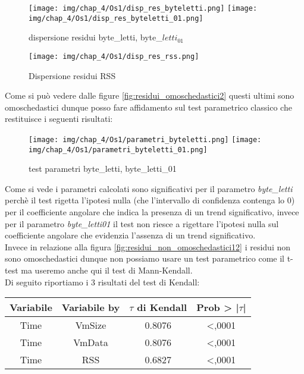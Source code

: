\begin{figure}[H]
    \centering
    \texttt{[image: img/chap\_4/Os1/disp\_res\_byteletti.png]}
    \texttt{[image: img/chap\_4/Os1/disp\_res\_byteletti\_01.png]}
    \caption{dispersione residui byte\_letti, byte\_$letti_{01}$}
    \label{fig:residui_omoschedastici}
\end{figure}
\begin{figure}[H]
    \centering
    \texttt{[image: img/chap\_4/Os1/disp\_res\_rss.png]}
    \caption{Dispersione residui RSS}
    \label{fig:residui_non_omoschedastici2}
\end{figure}
\noindent
Come si può vedere dalle figure \ref{fig:residui_omoschedastici2} questi ultimi sono omoschedastici dunque posso fare affidamento sul test parametrico classico che restituisce i seguenti risultati:
\begin{figure}[H]
    \centering
    \texttt{[image: img/chap\_4/Os1/parametri\_byteletti.png]}
    \texttt{[image: img/chap\_4/Os1/parametri\_byteletti\_01.png]}
    \caption{test parametri byte\_letti, byte\_letti\_01}
    \label{fig:residui_omoschedastici12}
\end{figure}
\noindent
Come si vede i parametri calcolati sono significativi per il parametro \textit{byte\_letti} perchè il test rigetta l'ipotesi nulla (che l'intervallo di confidenza contenga lo 0) per il coefficiente angolare che indica la presenza di un trend significativo, invece per il parametro \textit{byte\_letti01} il test non riesce a rigettare l'ipotesi nulla sul coefficiente angolare che evidenzia l'assenza di un trend significativo.\\
Invece in relazione alla figura \ref{fig:residui_non_omoschedastici12} i residui non sono omoschedastici dunque non possiamo usare un test parametrico come il t-test ma useremo anche qui il test di Mann-Kendall.\\
Di seguito riportiamo i 3 risultati del test di Kendall:
\begin{table}[htbp]
    \centering
    \label{tab:esempio}
    \begin{tabular}{|c|c|c|c|} %
        \hline
        Variabile & Variabile by & $\tau$ di Kendall &Prob > |$\tau$| \\ %
        \hline
        Time & VmSize & 0.8076 & <,0001\\
        Time & VmData & 0.8076 & <,0001\\
        Time & RSS & 0.6827 & <,0001\\
        \hline
    \end{tabular}
\end{table}
